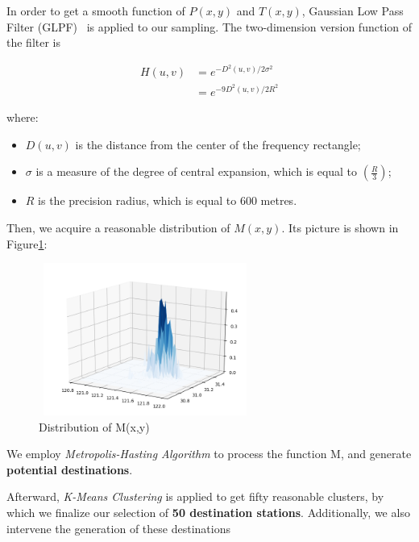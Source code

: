 \documentclass{mcmthesis}
\begin{document}
In order to get a smooth function of $P(x,y)$ and $T(x,y)$, Gaussian Low Pass Filter (GLPF)~\cite{DigitalImageProcessing} is applied to our sampling. The two-dimension version function of the filter is

\begin{equation}
    \begin{split}
      H(u,v)     & =   e^{-D^2(u,v)/2\sigma^2}\\
                 & =   e^{-9D^2(u,v)/2R^2}
    \end{split}
\end{equation}

where:
\begin{itemize}
\item $D(u,v)$ is the distance from the center of the frequency rectangle;
\item $\sigma$ is a measure of the degree of central expansion, which is equal to $\left( \frac{R}{3} \right)$;
\item $R$ is the precision radius, which is equal to 600 metres.
\end{itemize}

Then, we acquire a reasonable distribution of $M(x,y)$. Its picture is shown in Figure\ref{fig:M(x,y)}:

\begin{figure}[htbp]
    \centering
    \includegraphics[height=5cm,width=7cm]{figures/M(x,y).png}
    \caption{Distribution of M(x,y)}
    \label{fig:M(x,y)}
\end{figure}

We employ \emph{Metropolis-Hasting Algorithm} to process the function M, and generate \textbf{potential destinations}. 

Afterward, \emph{K-Means Clustering} is applied to get fifty reasonable clusters, by which we finalize our selection of \textbf{50 destination stations}. Additionally, we also intervene the generation of these destinations
\end{document}
